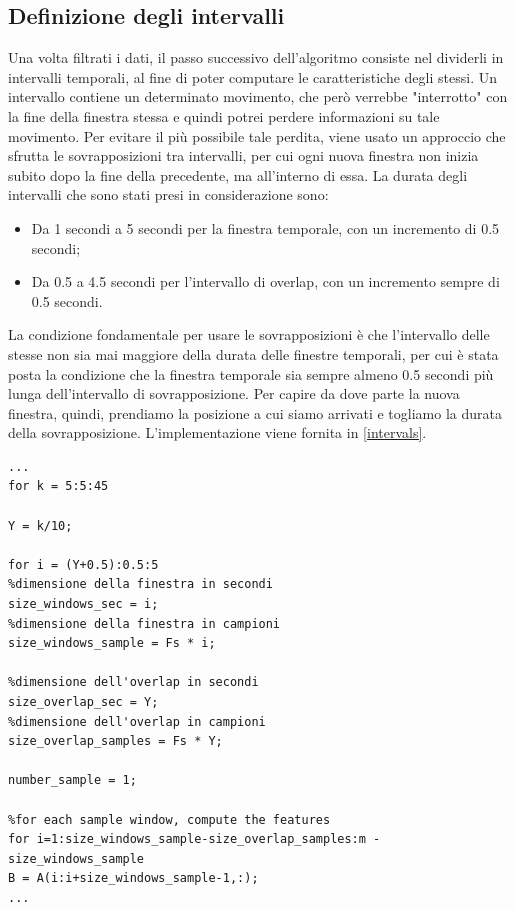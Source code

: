 \subsection{Definizione degli intervalli}
Una volta filtrati i dati, il passo successivo dell'algoritmo consiste nel dividerli in intervalli temporali, al fine di poter computare le caratteristiche degli stessi. Un intervallo contiene un determinato movimento, che però verrebbe "interrotto" con la fine della finestra stessa e quindi potrei perdere informazioni su tale movimento. Per evitare il più possibile tale perdita, viene usato un approccio che sfrutta le sovrapposizioni tra intervalli, per cui ogni nuova finestra non inizia subito dopo la fine della precedente, ma all'interno di essa. La durata degli intervalli che sono stati presi in considerazione sono:
\begin{itemize}
	\item  Da 1 secondi a 5 secondi per la finestra temporale, con un incremento di 0.5 secondi;
	\item Da 0.5 a 4.5 secondi per l'intervallo di overlap, con un incremento sempre di 0.5 secondi.
\end{itemize}
La condizione fondamentale per usare le sovrapposizioni è che l'intervallo delle stesse non sia mai maggiore della durata delle finestre temporali, per cui è stata posta la condizione che la finestra temporale sia sempre almeno 0.5 secondi più lunga dell'intervallo di sovrapposizione. Per capire da dove parte la nuova finestra, quindi, prendiamo la posizione a cui siamo arrivati e togliamo la durata della sovrapposizione. L'implementazione viene fornita in \ref{intervals}.
\begin{lstlisting}[style=Matlab-editor,frame=single, caption=Definizione degli intervalli, label=intervals]  % Start your code-block
...
for k = 5:5:45

Y = k/10;

for i = (Y+0.5):0.5:5
%dimensione della finestra in secondi
size_windows_sec = i;
%dimensione della finestra in campioni
size_windows_sample = Fs * i;

%dimensione dell'overlap in secondi
size_overlap_sec = Y;
%dimensione dell'overlap in campioni
size_overlap_samples = Fs * Y;

number_sample = 1;

%for each sample window, compute the features
for i=1:size_windows_sample-size_overlap_samples:m - size_windows_sample
B = A(i:i+size_windows_sample-1,:);
...
\end{lstlisting}

